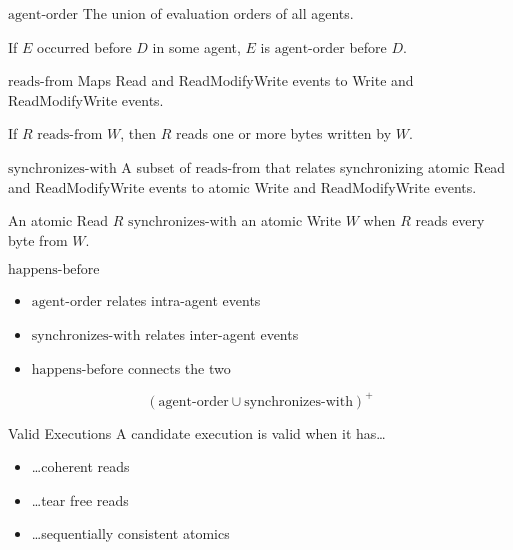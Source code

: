 \documentclass[notes]{beamer}
\begin{document}
\begin{frame}{$\textrm{agent-order}$}
  The union of evaluation orders of all agents.

  \begin{center}
    If $E$ occurred before $D$ in some agent, $E$ is $\textrm{agent-order}$ before $D$.
  \end{center}
\end{frame}

\begin{frame}{$\textrm{reads-from}$}
  Maps Read and ReadModifyWrite events to Write and ReadModifyWrite events.

  \begin{center}
    If $R$ $\textrm{reads-from}$ $W$, then $R$ reads one or more bytes written by $W$.
  \end{center}
\end{frame}

\begin{frame}{$\textrm{synchronizes-with}$}
  A subset of $\textrm{reads-from}$ that relates synchronizing atomic Read and ReadModifyWrite events to atomic Write and ReadModifyWrite events.

  \begin{center}
    An atomic Read $R$ $\textrm{synchronizes-with}$ an atomic Write $W$ when $R$ reads every byte from $W$.
  \end{center}

\end{frame}

\begin{frame}{$\textrm{happens-before}$}
  \begin{itemize}
  \item $\textrm{agent-order}$ relates intra-agent events
  \item $\textrm{synchronizes-with}$ relates inter-agent events
  \item $\textrm{happens-before}$ connects the two
  \end{itemize}

  $$(\textrm{agent-order} \cup \textrm{synchronizes-with})^{+}$$
\end{frame}

\begin{frame}{Valid Executions}
  A candidate execution is valid when it has\ldots

  \begin{itemize}
  \item \ldots coherent reads
  \item \ldots tear free reads
  \item \ldots sequentially consistent atomics
  \end{itemize}
\end{frame}
\end{document}
